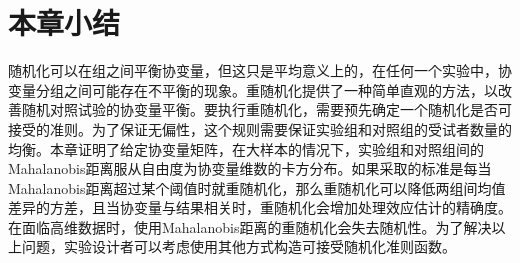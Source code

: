 




\section{本章小结}

随机化可以在组之间平衡协变量，但这只是平均意义上的，在任何一个实验中，协变量分组之间可能存在不平衡的现象。重随机化提供了一种简单直观的方法，以改善随机对照试验的协变量平衡。要执行重随机化，需要预先确定一个随机化是否可接受的准则。为了保证无偏性，这个规则需要保证实验组和对照组的受试者数量的均衡。本章证明了给定协变量矩阵，在大样本的情况下，实验组和对照组间的Mahalanobis距离服从自由度为协变量维数的卡方分布。如果采取的标准是每当Mahalanobis距离超过某个阈值时就重随机化，那么重随机化可以降低两组间均值差异的方差，且当协变量与结果相关时，重随机化会增加处理效应估计的精确度。在面临高维数据时，使用Mahalanobis距离的重随机化会失去随机性。为了解决以上问题，实验设计者可以考虑使用其他方式构造可接受随机化准则函数。
